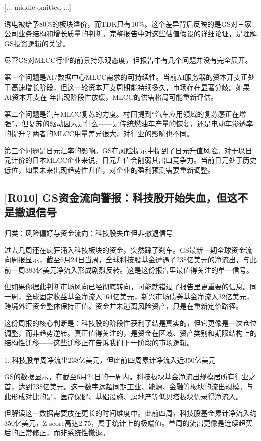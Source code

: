 \documentclass[11pt]{ctexart}
\begin{document}
[... middle omitted ...]

诱电被给予80\%的板块溢价，而TDK只有10\%。这个差异背后反映的是GS对三家公司业务结构和增长质量的判断。完整报告中对这些估值假设的详细论证，是理解GS投资逻辑的关键。

尽管GS对MLCC行业的前景持乐观态度，但报告中有几个问题并没有完全展开。

第一个问题是AI/数据中心MLCC需求的可持续性。当前AI服务器的资本开支正处于高速增长阶段，但这一轮资本开支周期能持续多久，市场存在显著分歧。如果AI资本开支在 年出现阶段性放缓，MLCC的供需格局可能重新评估。

第二个问题是汽车MLCC复苏的力度。村田提到“汽车应用领域的复苏感正在增强”，但复苏的驱动因素是什么——是传统燃油车产量的恢复，还是电动车渗透率的提升？两者的MLCC用量差异很大，对行业的影响也不同。

第三个问题是日元汇率的影响。GS在风险提示中提到了日元升值风险。对于以日元计价的日本MLCC企业来说，日元升值会削弱其出口竞争力。当前日元处于历史低位，如果未来出现趋势性升值，对企业的盈利预测需要重新调整。

\subsection{[R010] GS资金流向警报：科技股开始失血，但这不是撤退信号}
{\small\color{refgray}归类：风险偏好与资金流向：科技股失血但非撤退信号}

过去几周还在疯狂涌入科技板块的资金，突然踩了刹车。GS最新一期全球资金流向周报显示，截至6月24日当周，全球科技股基金遭遇了238亿美元的净流出，与此前一周383亿美元净流入形成剧烈反转。这是这份报告里最值得关注的单一信号。

但如果你据此判断市场风向已经彻底转向，可能就错过了报告里更重要的信息。同一周，全球固定收益基金净流入164亿美元，新兴市场债券基金净流入32亿美元，跨境外汇资金整体保持正值。资金并未逃离风险资产，只是在重新定价路径。

这份周报的核心判断是：科技股的阶段性获利了结是真实的，但它更像是一次仓位调整，而非趋势逆转。真正值得关注的，是资金在区域、资产类别和期限结构上的结构性迁移——这些迁移正在告诉我们下一阶段的市场逻辑。

1. 科技股单周净流出238亿美元，但此前四周累计净流入近350亿美元

GS的数据显示，在截至6月24日的一周内，科技板块基金净流出规模居所有行业之首，达到238亿美元。这一数字远超同期工业、能源、金融等板块的流出规模。与此形成对比的是，医疗保健、基础设施、房地产等低贝塔板块仍录得净流入。

但解读这一数据需要放在更长的时间维度中。此前四周，科技股基金累计净流入约350亿美元，Z-score高达2.75，属于统计上的极端值。单周的流出更像是连续超买后的正常修正，而非系统性撤退。
\end{document}
